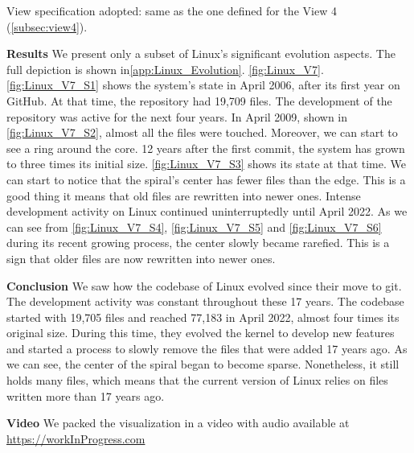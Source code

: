 View specification adopted: same as the one defined for the View 4 (\autoref{subsec:view4}).

\textbf{Results}
We present only a subset of Linux's significant evolution aspects. The full depiction is shown in\autoref{app:Linux_Evolution}. \autoref{fig:Linux_V7}. \autoref{fig:Linux_V7_S1} shows the system's state in April 2006, after its first year on GitHub. At that time, the repository had 19,709 files. The development of the repository was active for the next four years. In April 2009, shown in \autoref{fig:Linux_V7_S2}, almost all the files were touched. Moreover, we can start to see a ring around the core. 
12 years after the first commit, the system has grown to three times its initial size. \autoref{fig:Linux_V7_S3} shows its state at that time. We can start to notice that the spiral's center has fewer files than the edge. This is a good thing it means that old files are rewritten into newer ones. Intense development activity on Linux continued uninterruptedly until April 2022. As we can see from \autoref{fig:Linux_V7_S4}, \autoref{fig:Linux_V7_S5} and \autoref{fig:Linux_V7_S6} during its recent growing process, the center slowly became rarefied. This is a sign that older files are now rewritten into newer ones. 

\bigbreak
\textbf{Conclusion}
 We saw how the codebase of Linux evolved since their move to git. The development activity was constant throughout these 17 years. The codebase started with 19,705 files and reached 77,183 in April 2022, almost four times its original size. During this time, they evolved the kernel to develop new features and started a process to slowly remove the files that were added 17 years ago. As we can see, the center of the spiral began to become sparse. Nonetheless, it still holds many files, which means that the current version of Linux relies on files written more than 17 years ago. 

\bigbreak
\textbf{Video}
We packed the visualization in a video with audio available at \url{https://workInProgress.com}



